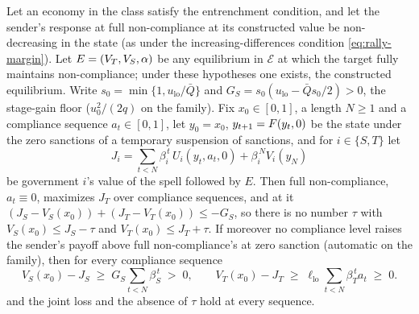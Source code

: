 \begin{proposition}
\label{prop:relief-participation}
Let an economy in the class satisfy the entrenchment condition, and let the
sender's response at full non-compliance at its constructed value be non-decreasing
in the state (as under the increasing-differences condition \eqref{eq:rally-margin}). Let
$E=(V_T,V_S,\alpha)$ be any equilibrium in $\mathcal E$ at which the target fully
maintains non-compliance; under these hypotheses one exists, the constructed equilibrium. Write
$s_0=\min\{1,u_{\mathrm{lo}}/\bar Q\}$ and $G_S=s_0(u_{\mathrm{lo}}-\bar Qs_0/2)>0$,
the stage-gain floor ($u_0^2/(2q)$ on the family). Fix $x_0\in[0,1]$, a length $N\ge1$ and a compliance sequence $a_t\in[0,1]$, let
$y_0=x_0$, $y_{t+1}=F(y_t,0)$ be the state under the zero sanctions of a temporary suspension of sanctions, and
for $i\in\{S,T\}$ let
\[
J_i=\sum_{t<N}\beta_i^{\,t}\,U_i(y_t,a_t,0)+\beta_i^{\,N}V_i(y_N)
\]
be government $i$'s value of the spell followed by $E$. Then
full non-compliance, $a_t\equiv0$, maximizes $J_T$ over compliance sequences, and at
it $(J_S-V_S(x_0))+(J_T-V_T(x_0))\le-G_S$, so there is no number $\tau$ with
$V_S(x_0)\le J_S-\tau$ and $V_T(x_0)\le J_T+\tau$. If moreover no compliance
level raises the sender's payoff above full non-compliance's at zero sanction
(automatic on the family), then for every compliance sequence
\[
V_S(x_0)-J_S\;\ge\;G_S\sum_{t<N}\beta_S^{\,t}\;>\;0,
\qquad
V_T(x_0)-J_T\;\ge\;\ell_{\mathrm{lo}}\sum_{t<N}\beta_T^{\,t}a_t\;\ge\;0 .
\]
and the joint loss and the absence of $\tau$ hold at every sequence.
\end{proposition}

